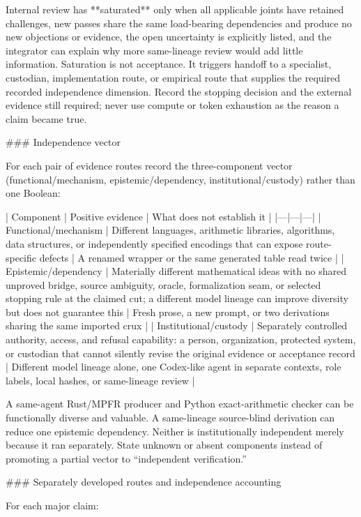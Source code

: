 \documentclass[11pt]{article}
\begin{document}
\begin{markdown}
Internal review has **saturated** only when all applicable joints have retained challenges, new
passes share the same load-bearing dependencies and produce no new objections or evidence, the
open uncertainty is explicitly listed, and the integrator can explain why more same-lineage review
would add little information. Saturation is not acceptance. It triggers handoff to a specialist,
custodian, implementation route, or empirical route that supplies the required recorded
independence dimension. Record the stopping decision and the external evidence still required;
never use compute or token exhaustion as the reason a claim became true.

### Independence vector

For each pair of evidence routes record the three-component vector (functional/mechanism,
epistemic/dependency, institutional/custody) rather than one Boolean:

| Component | Positive evidence | What does not establish it |
|---|---|---|
| Functional/mechanism | Different languages, arithmetic libraries, algorithms, data structures, or independently specified encodings that can expose route-specific defects | A renamed wrapper or the same generated table read twice |
| Epistemic/dependency | Materially different mathematical ideas with no shared unproved bridge, source ambiguity, oracle, formalization seam, or selected stopping rule at the claimed cut; a different model lineage can improve diversity but does not guarantee this | Fresh prose, a new prompt, or two derivations sharing the same imported crux |
| Institutional/custody | Separately controlled authority, access, and refusal capability: a person, organization, protected system, or custodian that cannot silently revise the original evidence or acceptance record | Different model lineage alone, one Codex-like agent in separate contexts, role labels, local hashes, or same-lineage review |

A same-agent Rust/MPFR producer and Python exact-arithmetic checker can be functionally diverse and
valuable. A same-lineage source-blind derivation can reduce one epistemic dependency. Neither is
institutionally independent merely because it ran separately. State unknown or absent components
instead of promoting a partial vector to “independent verification.”

### Separately developed routes and independence accounting

For each major claim:


\end{markdown}
\end{document}
